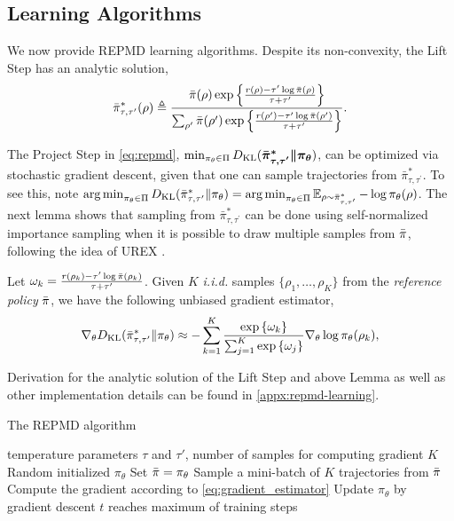 \subsection{Learning Algorithms}

We now provide REPMD learning algorithms.
Despite its non-convexity, the Lift Step
has an analytic solution,
{\small
\begin{equation}
	\label{eq:pitautauprime}
	\bar{\pi}_{\tau,\tau^{\prime}}^*(\rho) \triangleq \frac{\bar{\pi}(\rho) \exp\left\{ \frac{r(\rho)-\tau^{\prime} \log \bar{\pi}(\rho) }{ \tau+\tau^{\prime}} \right\}}{ \sum_{\rho^{\prime}}{\bar{\pi}(\rho^{\prime}) \exp\left\{ \frac{r(\rho^{\prime})-\tau^{\prime} \log \bar{\pi}(\rho^{\prime})}{ \tau+\tau^{\prime}} \right\} } }.
\end{equation}
}
	
The Project Step in \cref{eq:repmd}, $\min\nolimits_{\pi_\theta \in \Pi}{D_{\mathrm{KL}}(\bm{ \bar{\pi}_{\tau,\tau^{\prime}}^* \| \pi_\theta }) }$, can be optimized via stochastic gradient descent, given that one can sample trajectories from $\bar{\pi}_{\tau,\tau^{\prime}}^*$. To see this, note $\operatorname*{arg\,min}\nolimits_{\pi_\theta \in \Pi}D_{\mathrm{KL}}(\bar{\pi}_{\tau,\tau^{\prime}}^* \| \pi_\theta) = \operatorname*{arg\,min}\nolimits_{\pi_\theta \in \Pi} \operatorname*{\mathbb{E}}_{\rho \sim \bar{\pi}_{\tau,\tau^{\prime}}^* }  - \log \pi_\theta(\rho)$. The next lemma shows that sampling from $\bar{\pi}_{\tau,\tau^{\prime}}^*$ can be done using self-normalized importance sampling \citep{owen2013monte} when it is possible to draw multiple samples from $\bar{\pi}$, following the idea of UREX \citep{nachum2017improving}.   
\begin{lem}
\label{lem:repmdgradientestimate}
Let $\omega_k = \frac{r(\rho_k) - \tau^{\prime} \log{\bar{\pi}(\rho_k)} }{\tau + \tau^{\prime}}$. Given $K$ \emph{i.i.d.} samples $\{\rho_1, \dots, \rho_K\}$ from the \emph{reference policy} $\bar{\pi}$, we have the following unbiased gradient estimator,
{\small
\begin{equation}
\label{eq:gradient_estimator}
	\nabla_{\theta} D_{\mathrm{KL}}(\bar{\pi}_{\tau,\tau^{\prime}}^* \| \pi_\theta)\approx -\sum\limits_{k=1}^K{ \frac{ \exp\left\{ \omega_k \right\} }{ \sum_{j=1}^K{ \exp\left\{ \omega_j \right\}}} \nabla_{\theta} \log{\pi_\theta(\rho_k)} },
\end{equation}
}
\end{lem}
Derivation for the analytic solution of the Lift Step and above Lemma as well as other implementation details can be found in \cref{appx:repmd-learning}.

\begin{algorithm}[t]
	\caption{\label{alg:repmd}  The REPMD algorithm}
	\begin{algorithmic}[1]
		\INPUT temperature parameters $\tau$ and $\tau'$, number of samples for computing gradient $K$
		\STATE Random initialized $\pi_{\theta}$
		\STATE Set $\bar{\pi} = \pi_\theta$
		\REPEAT 
		\STATE Sample a mini-batch of $K$ trajectories from $\bar{\pi}$
		\STATE Compute the gradient according to \cref{eq:gradient_estimator}
		\STATE Update $\pi_{\theta}$ by gradient descent
		\UNTIL $t$ reaches maximum of training steps
		\ENDFOR
	\end{algorithmic}
\end{algorithm}

